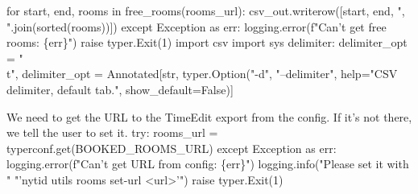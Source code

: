     for start, end, rooms in free_rooms(rooms_url):
      csv_out.writerow([start, end, ", ".join(sorted(rooms))])
  except Exception as err:
    logging.error(f"Can't get free rooms: \{err\}")
    raise typer.Exit(1)
\nwendcode{}\plusendmoddef\nwstartdeflinemarkup{}\nwenddeflinemarkup
import csv
import sys
\nwendcode{}\endmoddef\nwstartdeflinemarkup{}\nwenddeflinemarkup
delimiter: delimiter_opt = "\\t",
\nwendcode{}\endmoddef\nwstartdeflinemarkup{}\nwenddeflinemarkup
delimiter_opt = Annotated[str,
                          typer.Option("-d", "--delimiter",
                          help="CSV delimiter, default tab.",
                          show_default=False)]
\nwendcode{}\nwdocspar


We need to get the URL to the TimeEdit export from the config.
If it's not there, we tell the user to set it.
\nwenddocs{}\endmoddef\nwstartdeflinemarkup{}\nwenddeflinemarkup
try:
  rooms_url = typerconf.get(BOOKED_ROOMS_URL)
except Exception as err:
  logging.error(f"Can't get URL from config: \{err\}")
  logging.info("Please set it with "
               "'nytid utils rooms set-url <url>'")
  raise typer.Exit(1)
\nwendcode{}\nwdocspar


